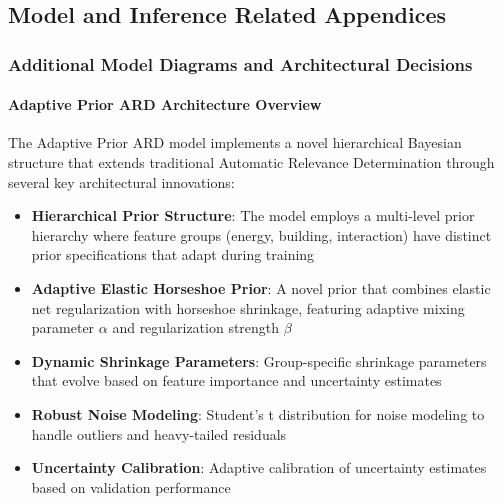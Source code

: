 \subsection{Model and Inference Related Appendices}

\subsubsection{Additional Model Diagrams and Architectural Decisions}

\paragraph{Adaptive Prior ARD Architecture Overview}
The Adaptive Prior ARD model implements a novel hierarchical Bayesian structure that extends traditional Automatic Relevance Determination through several key architectural innovations:

\begin{itemize}
    \item \textbf{Hierarchical Prior Structure}: The model employs a multi-level prior hierarchy where feature groups (energy, building, interaction) have distinct prior specifications that adapt during training
    \item \textbf{Adaptive Elastic Horseshoe Prior}: A novel prior that combines elastic net regularization with horseshoe shrinkage, featuring adaptive mixing parameter $\alpha$ and regularization strength $\beta$
    \item \textbf{Dynamic Shrinkage Parameters}: Group-specific shrinkage parameters that evolve based on feature importance and uncertainty estimates
    \item \textbf{Robust Noise Modeling}: Student's t distribution for noise modeling to handle outliers and heavy-tailed residuals
    \item \textbf{Uncertainty Calibration}: Adaptive calibration of uncertainty estimates based on validation performance
\end{itemize}

